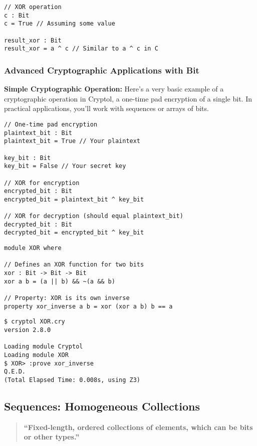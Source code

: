 \begin{lstlisting}[style=cryptol]
// XOR operation
c : Bit
c = True // Assuming some value

result_xor : Bit
result_xor = a ^ c // Similar to a ^ c in C
\end{lstlisting}


\subsubsection{Advanced Cryptographic Applications with Bit}
\textbf{Simple Cryptographic Operation:} Here’s a very basic example of a cryptographic operation in Cryptol, a one-time pad encryption of a single bit. In practical applications, you'll work with sequences or arrays of bits.

\begin{lstlisting}[style=cryptol]
// One-time pad encryption
plaintext_bit : Bit
plaintext_bit = True // Your plaintext

key_bit : Bit
key_bit = False // Your secret key

// XOR for encryption
encrypted_bit : Bit
encrypted_bit = plaintext_bit ^ key_bit

// XOR for decryption (should equal plaintext_bit)
decrypted_bit : Bit
decrypted_bit = encrypted_bit ^ key_bit           
\end{lstlisting}

\begin{lstlisting}[style=cryptol]
module XOR where

// Defines an XOR function for two bits
xor : Bit -> Bit -> Bit
xor a b = (a || b) && ~(a && b)

// Property: XOR is its own inverse
property xor_inverse a b = xor (xor a b) b == a
\end{lstlisting}
\begin{lstlisting}[style=zsh]
$ cryptol XOR.cry
version 2.8.0

Loading module Cryptol
Loading module XOR
$ XOR> :prove xor_inverse
Q.E.D.
(Total Elapsed Time: 0.008s, using Z3)
\end{lstlisting}

\newpage
\subsection{Sequences: Homogeneous Collections}
\begin{quote}\bf
``Fixed-length, ordered collections of elements, which can be bits or other types.''
\end{quote}

